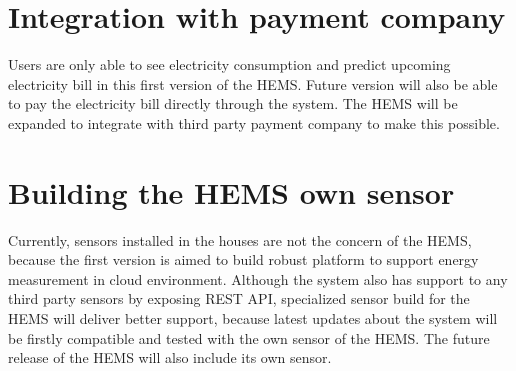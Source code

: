 \section{Integration with payment company}
Users are only able to see electricity consumption and predict upcoming electricity bill in this first version of the HEMS. Future version will also be able to pay the electricity bill directly through the system. The HEMS will be expanded to integrate with third party payment company to make this possible.

\section{Building the HEMS own sensor}
Currently, sensors installed in the houses are not the concern of the HEMS, because the first version is aimed to build robust platform to support energy measurement in cloud environment. Although the system also has support to any third party sensors by exposing REST API, specialized sensor build for the HEMS will deliver better support, because latest updates about the system will be firstly compatible and tested with the own sensor of the HEMS. The future release of the HEMS will also include its own sensor.

